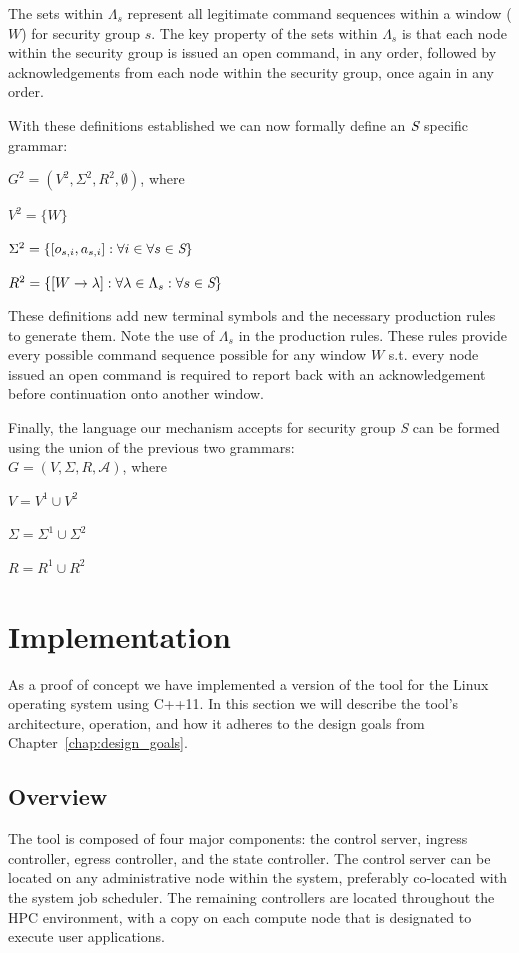 \documentclass[oneside,12pt]{memoir}
\newcommand{\tab}{\hspace*{2em}}
\begin{document}
The sets within $\Lambda_s$ represent all legitimate command sequences within a window ($W$) for security group $s$. The key property of the sets within $\Lambda_s$ is that each node within the security group is issued an open command, in any order, followed by acknowledgements from each node within the security group, once again in any order.

With these definitions established we can now formally define an $\emph{S}$ specific grammar:

\tab $G^2 = (V^2, \Sigma^2, R^2, \emptyset)$, where

\tab $V^2 =\{W\}$

\tab $\Sigma ^2 = \{[o_{s,i}, a_{s,i}]:\forall i \in \forall s\in \emph{S}\}$

\tab $R^2 = \{[W\rightarrow \lambda  ] :\forall \lambda \in \Lambda_s :\forall s\in \emph{S}\}$


These definitions add new terminal symbols and the necessary production rules to generate them. Note the use of $\Lambda_s$ in the production rules. These rules provide every possible command sequence possible for any window $W$ s.t. every node issued an open command is required to report back with an acknowledgement before continuation onto another window.

Finally, the language our mechanism accepts for security group \emph{S} can be formed using the union of the previous two grammars:\\

\tab $G = (V, \Sigma , R, \mathcal{A})$, where

\tab $V = V^1\cup V^2$

\tab $\Sigma = \Sigma ^1\cup \Sigma ^2$

\tab $R = R^1\cup R^2$
\chapter{Implementation}
\label{chap:implementation}
As a proof of concept we have implemented a version of the tool for the Linux operating system using C++11. In this section we will describe the tool's architecture, operation, and how it adheres to the design goals from Chapter~\ref{chap:design_goals}.
\section{Overview}
The tool is composed of four major components:  the control server, ingress controller, egress controller, and the state controller. The control server can be located on any administrative node within the system, preferably co-located with the system job scheduler. The remaining controllers are located throughout the HPC environment, with a copy on each compute node that is designated to execute user applications. 
\end{document}
